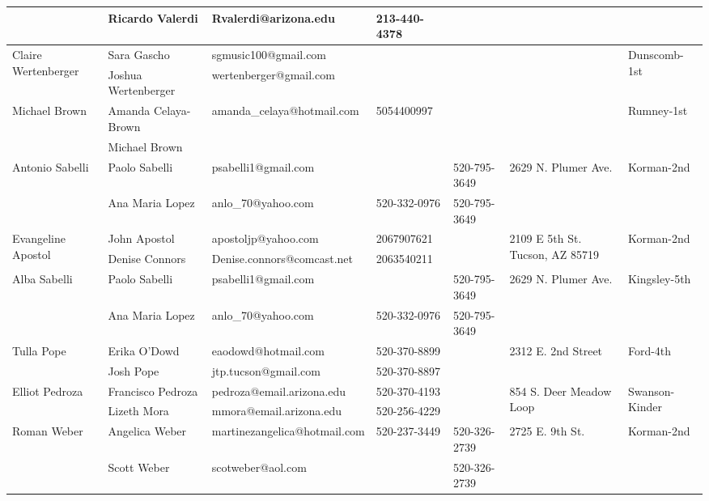 \documentclass[landscape]{book}\usepackage[]{graphicx}\usepackage[]{color}
\begin{document}
\begin{longtable}{p{70pt}|p{75pt}|p{120pt}|p{60pt}|p{60pt}|p{100pt}|p{70pt}|}
 & Ricardo Valerdi & Rvalerdi@arizona.edu & 213-440-4378 &  & & \\
\hline
\multirow{2}{70pt}{Claire Wertenberger} & Sara Gascho & sgmusic100@gmail.com &  &  & \multirow{2}{100pt}{} & \multirow{2}{70pt}{Dunscomb-1st}\\
 & Joshua Wertenberger & wertenberger@gmail.com &  &  & & \\
\hline
\multirow{2}{70pt}{Michael Brown} & Amanda Celaya-Brown & amanda\_celaya@hotmail.com & 5054400997 &  & \multirow{2}{100pt}{} & \multirow{2}{70pt}{Rumney-1st}\\
 & Michael Brown &  &  &  & & \\
\hline
\multirow{2}{70pt}{Antonio Sabelli} & Paolo Sabelli & psabelli1@gmail.com &  & 520-795-3649 & \multirow{2}{100pt}{2629 N. Plumer Ave.} & \multirow{2}{70pt}{Korman-2nd}\\
 & Ana Maria Lopez & anlo\_70@yahoo.com & 520-332-0976 & 520-795-3649 & & \\
\hline
\multirow{2}{70pt}{Evangeline Apostol} & John Apostol & apostoljp@yahoo.com & 2067907621 &  & \multirow{2}{100pt}{2109 E 5th St. Tucson, AZ 85719} & \multirow{2}{70pt}{Korman-2nd}\\
 & Denise Connors & Denise.connors@comcast.net & 2063540211 &  & & \\
\hline
\multirow{2}{70pt}{Alba Sabelli} & Paolo Sabelli & psabelli1@gmail.com &  & 520-795-3649 & \multirow{2}{100pt}{2629 N. Plumer Ave.} & \multirow{2}{70pt}{Kingsley-5th}\\
 & Ana Maria Lopez & anlo\_70@yahoo.com & 520-332-0976 & 520-795-3649 & & \\
\hline
\multirow{2}{70pt}{Tulla Pope} & Erika O'Dowd & eaodowd@hotmail.com & 520-370-8899 &  & \multirow{2}{100pt}{2312 E. 2nd Street} & \multirow{2}{70pt}{Ford-4th}\\
 & Josh Pope & jtp.tucson@gmail.com & 520-370-8897 &  & & \\
\hline
\multirow{2}{70pt}{Elliot Pedroza} & Francisco Pedroza & pedroza@email.arizona.edu & 520-370-4193 &  & \multirow{2}{100pt}{854 S. Deer Meadow Loop} & \multirow{2}{70pt}{Swanson-Kinder}\\
 & Lizeth Mora & mmora@email.arizona.edu & 520-256-4229 &  & & \\
\hline
\multirow{2}{70pt}{Roman Weber} & Angelica Weber & martinezangelica@hotmail.com & 520-237-3449 & 520-326-2739 & \multirow{2}{100pt}{2725 E. 9th St.} & \multirow{2}{70pt}{Korman-2nd}\\
 & Scott Weber & scotweber@aol.com &  & 520-326-2739 & & \\

\end{longtable}
\end{document}
